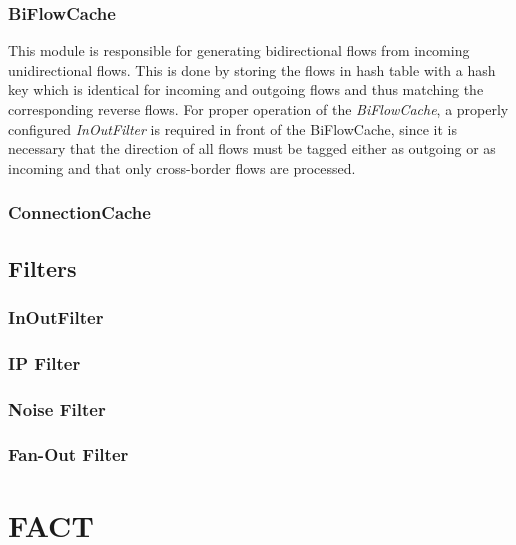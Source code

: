 \subsubsection{BiFlowCache} This module is responsible for generating
bidirectional flows from incoming unidirectional flows. This is done by
storing the flows in hash table with a hash key which is identical for incoming
and outgoing flows and thus matching the corresponding reverse flows. For proper operation of the \emph{BiFlowCache}, a properly configured \emph{InOutFilter} is required in front of the BiFlowCache, since it is necessary that the direction of all flows must be tagged either as outgoing or as incoming and that only cross-border flows are processed.

\subsubsection{ConnectionCache}

\subsection{Filters}
\subsubsection{InOutFilter}
\subsubsection{IP Filter} 
\subsubsection{Noise Filter} 
\subsubsection{Fan-Out Filter}

\section{FACT}

